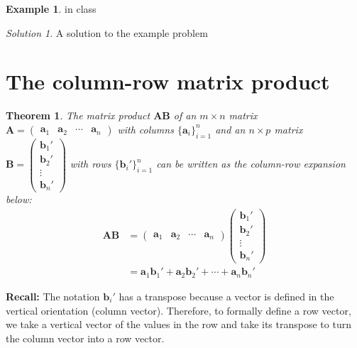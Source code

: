 \documentclass[
]{book}
\newtheorem{theorem}{Theorem}[chapter]
\theoremstyle{definition}
\theoremstyle{definition}
\newtheorem{example}{Example}[chapter]
\theoremstyle{definition}
\theoremstyle{remark}
\newtheorem*{solution}{Solution}
\begin{document}
\begin{example}
\protect\hypertarget{exm:unnamed-chunk-150}{}{\label{exm:unnamed-chunk-150} }in class
\end{example}

\begin{solution}

A solution to the example problem

\end{solution}

\hypertarget{the-column-row-matrix-product}{%
\section{The column-row matrix product}\label{the-column-row-matrix-product}}

\begin{theorem}
\protect\hypertarget{thm:block-matrix-multiplication}{}{\label{thm:block-matrix-multiplication} }The matrix product \(\mathbf{A}\mathbf{B}\) of an \(m \times n\) matrix \(\mathbf{A} = \begin{pmatrix} \mathbf{a}_1 & \mathbf{a}_2 & \cdots & \mathbf{a}_n \end{pmatrix}\) with columns \(\{\mathbf{a}_i\}_{i=1}^n\) and an \(n \times p\) matrix \(\mathbf{B} = \begin{pmatrix} \mathbf{b}_1' \\ \mathbf{b}_2' \\ \vdots \\ \mathbf{b}_n' \end{pmatrix}\) with rows \(\{\mathbf{b}_i'\}_{i=1}^n\) can be written as the column-row expansion below:
\[
\begin{aligned}
\mathbf{A} \mathbf{B} & =
\begin{pmatrix} \mathbf{a}_1 & \mathbf{a}_2 & \cdots & \mathbf{a}_n \end{pmatrix} \begin{pmatrix} \mathbf{b}_1' \\ \mathbf{b}_2' \\ \vdots \\ \mathbf{b}_n' \end{pmatrix} \\
& = \mathbf{a}_1 \mathbf{b}_1' + \mathbf{a}_2 \mathbf{b}_2' + \cdots + \mathbf{a}_n \mathbf{b}_n'
\end{aligned} 
\label{eq:block-matrix-multiplication}
\]
\end{theorem}

\textbf{Recall:} The notation \(\mathbf{b}_i'\) has a transpose because a vector is defined in the vertical orientation (column vector). Therefore, to formally define a row vector, we take a vertical vector of the values in the row and take its transpose to turn the column vector into a row vector.
\end{document}

